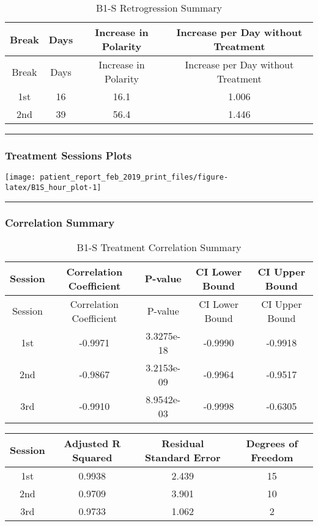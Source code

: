 \documentclass[]{article}
\begin{document}
\begin{longtable}[]{@{}cccc@{}}
\caption{B1-S Retrogression Summary}\tabularnewline
\toprule
Break & Days & Increase in Polarity & Increase per Day without
Treatment\tabularnewline
\midrule
\endfirsthead
\toprule
Break & Days & Increase in Polarity & Increase per Day without
Treatment\tabularnewline
\midrule
\endhead
1st & 16 & 16.1 & 1.006\tabularnewline
2nd & 39 & 56.4 & 1.446\tabularnewline
\bottomrule
\end{longtable}

\begin{center}\rule{0.5\linewidth}{\linethickness}\end{center}

\subsubsection{Treatment Sessions
Plots}\label{treatment-sessions-plots-1}

\texttt{[image: patient\_report\_feb\_2019\_print\_files/figure-latex/B1S\_hour\_plot-1]}

\begin{center}\rule{0.5\linewidth}{\linethickness}\end{center}

\subsubsection{Correlation Summary}\label{correlation-summary-1}

\begin{longtable}[]{@{}ccccc@{}}
\caption{B1-S Treatment Correlation Summary}\tabularnewline
\toprule
Session & Correlation Coefficient & P-value & CI Lower Bound & CI Upper
Bound\tabularnewline
\midrule
\endfirsthead
\toprule
Session & Correlation Coefficient & P-value & CI Lower Bound & CI Upper
Bound\tabularnewline
\midrule
\endhead
1st & -0.9971 & 3.3275e-18 & -0.9990 & -0.9918\tabularnewline
2nd & -0.9867 & 3.2153e-09 & -0.9964 & -0.9517\tabularnewline
3rd & -0.9910 & 8.9542e-03 & -0.9998 & -0.6305\tabularnewline
\bottomrule
\end{longtable}

\begin{longtable}[]{@{}cccc@{}}
\toprule
Session & Adjusted R Squared & Residual Standard Error & Degrees of
Freedom\tabularnewline
\midrule
\endhead
1st & 0.9938 & 2.439 & 15\tabularnewline
2nd & 0.9709 & 3.901 & 10\tabularnewline
3rd & 0.9733 & 1.062 & 2\tabularnewline
\bottomrule
\end{longtable}
\end{document}
